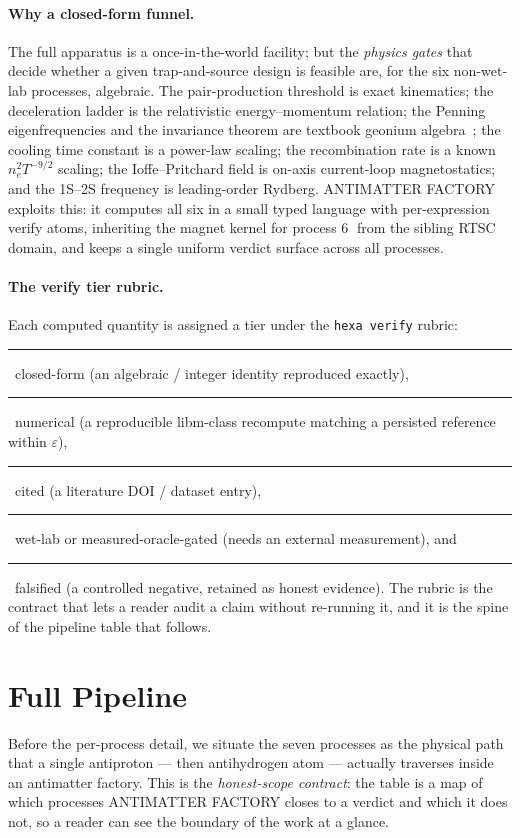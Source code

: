 \documentclass[11pt,a4paper]{article}
\newcommand{\tierdisc}[1]{\textcolor{#1}{\rule[0.05ex]{1.0ex}{1.0ex}}}
\newcommand{\tierBlue}{\tierdisc{blue!70!black}}
\newcommand{\tierGreen}{\tierdisc{green!60!black}}
\newcommand{\tierYellow}{\tierdisc{yellow!85!black}}
\newcommand{\tierOrange}{\tierdisc{orange!90!black}}
\newcommand{\tierRed}{\tierdisc{red!80!black}}
\begin{document}
\paragraph{Why a closed-form funnel.} The full apparatus is a
once-in-the-world facility; but the \emph{physics gates} that decide whether
a given trap-and-source design is feasible are, for the six non-wet-lab
processes, algebraic. The pair-production threshold is exact kinematics; the
deceleration ladder is the relativistic energy--momentum relation; the
Penning eigenfrequencies and the invariance theorem are textbook geonium
algebra~\citep{brown1986geonium}; the cooling time constant is a power-law
scaling; the recombination rate is a known $n_e^2 T^{-9/2}$ scaling; the
Ioffe--Pritchard field is on-axis current-loop magnetostatics; and the
1S--2S frequency is leading-order Rydberg. ANTIMATTER FACTORY exploits this:
it computes all six in a small typed language with per-expression verify
atoms, inheriting the magnet kernel for process \textcircled{\scriptsize 6}
from the sibling RTSC domain, and keeps a single uniform verdict surface
across all processes.

\paragraph{The verify tier rubric.} Each computed quantity is assigned a
tier under the \texttt{hexa verify} rubric: \tierBlue\ closed-form (an
algebraic / integer identity reproduced exactly), \tierGreen\ numerical (a
reproducible libm-class recompute matching a persisted reference within
$\varepsilon$), \tierYellow\ cited (a literature DOI / dataset entry),
\tierOrange\ wet-lab or measured-oracle-gated (needs an external
measurement), and \tierRed\ falsified (a controlled negative, retained as
honest evidence). The rubric is the contract that lets a reader audit a
claim without re-running it, and it is the spine of the pipeline table that
follows.

\section{Full Pipeline}
\label{sec:pipeline}

Before the per-process detail, we situate the seven processes as the
physical path that a single antiproton --- then antihydrogen atom ---
actually traverses inside an antimatter factory. This is the
\emph{honest-scope contract}: the table is a map of which processes
ANTIMATTER FACTORY closes to a verdict and which it does not, so a reader can
see the boundary of the work at a glance.
\end{document}
